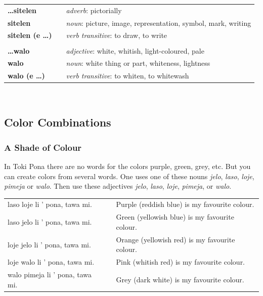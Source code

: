 \begin{supertabular}{p{2,5cm}|ll}
\textbf{\dots sitelen} && \textit{adverb}: pictorially \\ %
\textbf{sitelen} && \textit{noun}: picture, image, representation, symbol, mark, writing \\ %
\textbf{sitelen (e \dots)} && \textit{verb transitive}: to draw, to write \\ %
 && \\ %
%
\textbf{\dots walo} && \textit{adjective}: white, whitish, light-coloured, pale \\ %
\textbf{walo} && \textit{noun}: white thing or part, whiteness, lightness \\ %
\textbf{walo (e \dots)} && \textit{verb transitive}: to whiten, to whitewash \\ %
%
\end{supertabular} \\
%
%
\newpage
%
\subsection*{Color Combinations}
\subsubsection*{A Shade of Colour}
%
%
In Toki Pona there are no words for the colors purple, green, grey, etc.
But you can create colors from several words.
One uses one of these nouns \textit{jelo}, \textit{laso}, \textit{loje}, \textit{pimeja} or \textit{walo}. 
Then use these adjectives \textit{jelo}, \textit{laso}, \textit{loje}, \textit{pimeja}, or \textit{walo}. 

\begin{supertabular}{p{5,5cm}|ll}
laso loje li ' pona, tawa mi. && Purple (reddish blue) is my favourite colour. \\
laso jelo li ' pona, tawa mi. && Green (yellowish blue) is my favourite colour. \\
loje jelo li ' pona, tawa mi. && Orange (yellowish red) is my favourite colour. \\
loje walo li ' pona, tawa mi. && Pink (whitish red) is my favourite colour. \\
walo pimeja li ' pona, tawa mi. && Grey (dark white) is my favourite colour. \\
\end{supertabular} 

